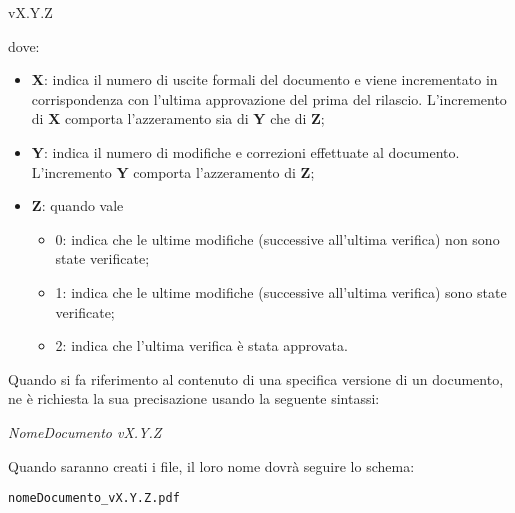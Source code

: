 \begin{center}
vX.Y.Z
\end{center}
dove:
\begin{itemize}
\item \textbf{X}: indica il numero di uscite formali del documento e viene incrementato in corrispondenza con l'ultima approvazione del \rRP prima del rilascio. L'incremento di \textbf{X} comporta l'azzeramento sia di \textbf{Y} che di \textbf{Z};
\item \textbf{Y}: indica il numero di modifiche e correzioni effettuate al documento. L'incremento \textbf{Y} comporta l'azzeramento di \textbf{Z};
\item \textbf{\textbf{Z}}: quando vale\begin{itemize}[label=]
\item 0: indica che le ultime modifiche (successive all'ultima verifica) non sono state verificate;
\item 1: indica che le ultime modifiche (successive all'ultima verifica) sono state verificate;
\item 2: indica che l'ultima verifica è stata approvata.
\end{itemize}
\end{itemize}
Quando si fa riferimento al contenuto di una specifica versione di un documento, ne è richiesta la sua precisazione usando la seguente sintassi:
\begin{center}
\textit{NomeDocumento vX.Y.Z}
\end{center}
Quando saranno creati i file, il loro nome dovrà seguire lo schema:
\begin{center}
\texttt{nomeDocumento\_vX.Y.Z.pdf}
\end{center}
